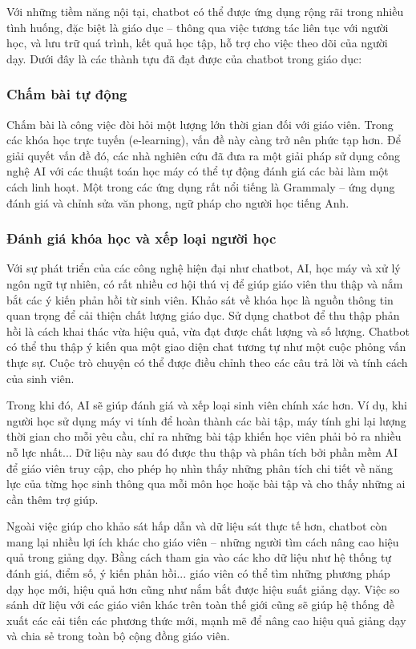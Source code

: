Với những tiềm năng nội tại, chatbot có thể được ứng dụng rộng rãi trong nhiều tình huống, đặc biệt là giáo dục – thông qua việc tương tác liên tục với người học, và lưu trữ quá trình, kết quả học tập, hỗ trợ cho việc theo dõi của người dạy. Dưới đây là các thành tựu đã đạt được của chatbot trong giáo dục:

\subsubsection{Chấm bài tự động}
Chấm bài là công việc đòi hỏi một lượng lớn thời gian đối với giáo viên. Trong các khóa học trực tuyến (e-learning), vấn đề này càng trở nên phức tạp hơn. Để giải quyết vấn đề đó, các nhà nghiên cứu đã đưa ra một giải pháp sử dụng công nghệ AI với các thuật toán học máy có thể tự động đánh giá các bài làm một cách linh hoạt. Một trong các ứng dụng rất nổi tiếng là Grammaly – ứng dụng đánh giá và chỉnh sửa văn phong, ngữ pháp cho người học tiếng Anh.\par

\subsubsection{Đánh giá khóa học và xếp loại người học}
Với sự phát triển của các công nghệ hiện đại như chatbot, AI, học máy và xử lý ngôn ngữ tự nhiên, có rất nhiều cơ hội thú vị để giúp giáo viên thu thập và nắm bắt các ý kiến phản hồi từ sinh viên. Khảo sát về khóa học là nguồn thông tin quan trọng để cải thiện chất lượng giáo dục. Sử dụng chatbot để thu thập phản hồi là cách khai thác vừa hiệu quả, vừa đạt được chất lượng và số lượng. Chatbot có thể thu thập ý kiến qua một giao diện chat tương tự như một cuộc phỏng vấn thực sự. Cuộc trò chuyện có thể được điều chỉnh theo các câu trả lời và tính cách của sinh viên.\par
Trong khi đó, AI sẽ giúp đánh giá và xếp loại sinh viên chính xác hơn. Ví dụ, khi người học sử dụng máy vi tính để hoàn thành các bài tập, máy tính ghi lại lượng thời gian cho mỗi yêu cầu, chỉ ra những bài tập khiến học viên phải bỏ ra nhiều nỗ lực nhất... Dữ liệu này sau đó được thu thập và phân tích bởi phần mềm AI để giáo viên truy cập, cho phép họ nhìn thấy những phân tích chi tiết về năng lực của từng học sinh thông qua mỗi môn học hoặc bài tập và cho thấy những ai cần thêm trợ giúp.\par
Ngoài việc giúp cho khảo sát hấp dẫn và dữ liệu sát thực tế hơn, chatbot còn mang lại nhiều lợi ích khác cho giáo viên – những người tìm cách nâng cao hiệu quả trong giảng dạy. Bằng cách tham gia vào các kho dữ liệu như hệ thống tự đánh giá, điểm số, ý kiến phản hồi... giáo viên có thể tìm những phương pháp dạy học mới, hiệu quả hơn cũng như nắm bắt được hiệu suất giảng dạy. Việc so sánh dữ liệu với các giáo viên khác trên toàn thế giới cũng sẽ giúp hệ thống đề xuất các cải tiến các phương thức mới, mạnh mẽ để nâng cao hiệu quả giảng dạy và chia sẻ trong toàn bộ cộng đồng giáo viên.\par

